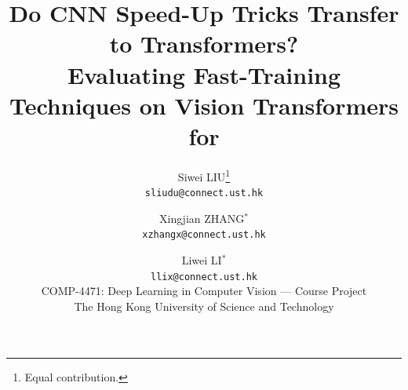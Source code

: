 \documentclass[10pt,twocolumn,letterpaper]{article}
\title{Do CNN Speed-Up Tricks Transfer to Transformers?\\
    \large Evaluating Fast-Training Techniques on Vision Transformers for \cifar{}}
\author{Siwei LIU\thanks{Equal contribution.}\\
{\tt\small sliudu@connect.ust.hk}
\and
Xingjian ZHANG$^*$\\
{\tt\small xzhangx@connect.ust.hk}
\and
Liwei LI$^*$\\
{\tt\small llix@connect.ust.hk}
\\[4pt]
\normalsize COMP-4471: Deep Learning in Computer Vision --- Course Project\\
\normalsize The Hong Kong University of Science and Technology}
\begin{document}
\maketitle









{
    \small
    
    
}
\end{document}
